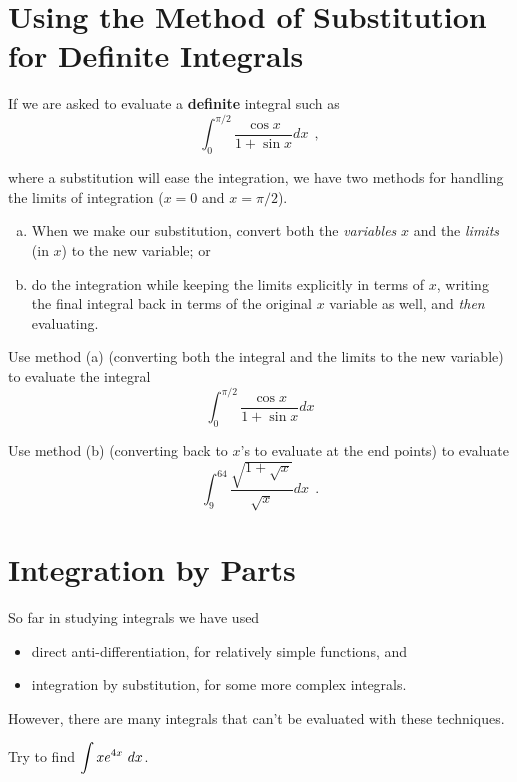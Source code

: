 \section*{Using the Method of Substitution for Definite Integrals}

If we are asked to evaluate a {\bf definite} integral such as
$$
\int_0^{\pi/2} \frac{\cos x}{1+\sin x} dx \ \ ,
$$

where a substitution will ease the integration, we have two methods
for handling the limits of integration ($x=0$ and $x=\pi/2$).
\begin{enumerate}[a)]
\item When we make our substitution, convert both the {\em variables}
  $x$ and the {\em limits} (in $x$) to the new variable; or
\item do the integration while keeping the limits explicitly in terms
  of $x$, writing the final integral back in terms of the original $x$
  variable as well, and {\em then} evaluating.
\end{enumerate}

\newpage

\problem Use method (a) (converting both the integral and the limits
to the new variable) to evaluate the integral
$$\int_0^{\pi/2} \frac{\cos x}{1+\sin x} dx$$

\vfill

\newpage
\problem Use method (b) (converting back to $x$'s to evaluate at the
end points) to evaluate
$$ \int_9^{64} \frac{\sqrt{1 + \sqrt{x}}}{\sqrt{x}} dx \ \ .
$$

\newpage


\section*{Integration by Parts}

So far in studying integrals we have used 
\begin{itemize}
\item direct anti-differentiation, for relatively simple functions,
  and
\item integration by substitution, for some more complex integrals.
\end{itemize}

However, there are many integrals that can't be evaluated with these
techniques.

\problem Try to find $\displaystyle \int x e^{4x} ~dx$.

